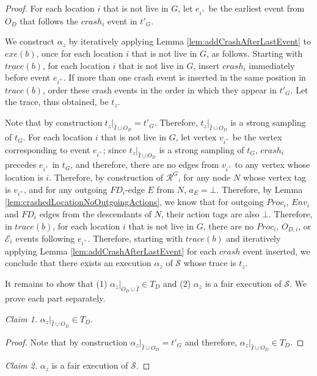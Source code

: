 \documentclass[11pt]{article}
\numberwithin{theorem}{section}
\begin{document}
\begin{proof}
For each location $i$ that is not live in $G$, let $e_{i^+}$ be the earliest event from $O_D$ that follows the $crash_i$ event in $t'_G$.

We construct $\alpha_z$ by iteratively applying Lemma \ref{lem:addCrashAfterLastEvent} to $exe(b)$, once for each location $i$ that is not live in $G$, as follows. Starting with  $trace(b)$, for each location $i$ that is not live in $G$, insert $crash_i$ immediately before event $e_{i^+}$. If more than one crash event is inserted in the same position in $trace(b)$, order these crash events in the order in which they appear in $t'_G$.
Let the trace, thus obtained, be $t_z$. 

Note that by construction $t_z|_{\hat{I} \cup O_D} = t'_G$. Therefore, $t_z|_{\hat{I} \cup O_D}$ is a strong sampling of $t_G$. For each location $i$ that is not live in $G$, let vertex $v_{i^+}$ be the vertex corresponding to event $e_{i^+}$; since $t_z|_{\hat{I} \cup O_D}$ is a strong sampling of $t_G$, $crash_i$ precedes $e_{i^+}$ in $t_G$, and therefore, there are no edges from $v_{i^+}$ to any vertex whose location is $i$. Therefore, by construction of $\mathcal{R}^G$, for any node $N$ whose vertex tag is $v_{i^+}$, and for any outgoing $FD_i$-edge $E$ from $N$, $a_E = \bot$. Therefore, by Lemma \ref{lem:crashedLocationNoOutgoingActions}, we know that for outgoing $Proc_i$, $Env_i$ and $FD_i$ edges from the descendants  of $N$, their action tags are also $\bot$. Therefore, in $trace(b)$, for each location $i$ that is not live in $G$, there are no $Proc_i$, $O_{D,i}$, or $\mathcal{E}_i$ events following $e_{i^+}$.
Therefore, starting with $trace(b)$ and iteratively applying Lemma \ref{lem:addCrashAfterLastEvent} for each $crash$ event inserted, we conclude that there exists an execution $\alpha_z$ of $\mathcal{S}$ whose trace is $t_z$.

It remains to show that (1) $\alpha_z|_{O_D \cup \hat{I}} \in T_D$ and (2) $\alpha_z$ is a fair execution of $\mathcal{S}$. We prove each part separately.

\emph{Claim 1.} $\alpha_z|_{\hat{I} \cup O_D} \in T_D$.
\begin{proof}
Note that by construction $\alpha_z|_{\hat{I} \cup O_D} = t'_G$ and therefore, $\alpha_z|_{\hat{I} \cup O_D} \in T_D$.
\end{proof}






\emph{Claim 2.}
$\alpha_z$ is a fair execution of $\mathcal{S}$.


\end{proof}
\end{document}
